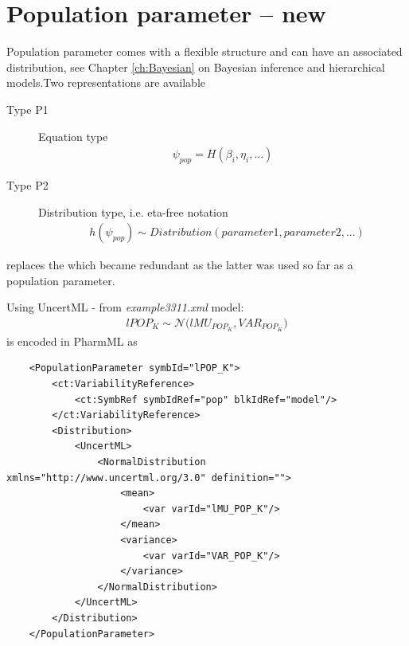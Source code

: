 \section{Population parameter -- new}
\label{sec:populationParameter}
Population parameter comes with a flexible structure and can have an 
associated distribution, see Chapter \ref{ch:Bayesian} on Bayesian inference 
and hierarchical models.Two representations are available 
\begin{description} 
\item[Type P1] Equation type
\begin{align*}
\psi_{pop} = H(\beta_i, \eta_i, ...)
\end{align*}
\item[Type P2] Distribution type, i.e. eta-free notation 
\begin{align*}
	& h(\psi_{pop}) \sim Distribution(parameter1, parameter2, ...)
\end{align*}
\end{description}

\begin{note} 
 replaces the  which 
became redundant as the \marginpar{\HandCuffLeft} latter was used so far 
as a population parameter.
\end{note} 

\begin{example}
Using UncertML - from \emph{example3311.xml} model:
\begin{align*}
	lPOP_K \sim \mathcal N\big(lMU_{POP_K}, VAR_{POP_K}\big)
\end{align*}
is encoded in PharmML as
\lstset{language=XML}
\begin{lstlisting}
    <PopulationParameter symbId="lPOP_K">
        <ct:VariabilityReference>
            <ct:SymbRef symbIdRef="pop" blkIdRef="model"/>
        </ct:VariabilityReference>
        <Distribution>
            <UncertML>
                <NormalDistribution xmlns="http://www.uncertml.org/3.0" definition="">
                    <mean>
                        <var varId="lMU_POP_K"/>
                    </mean>
                    <variance>
                        <var varId="VAR_POP_K"/>
                    </variance>
                </NormalDistribution>
            </UncertML>
        </Distribution>
    </PopulationParameter>
\end{lstlisting}
\end{example}

